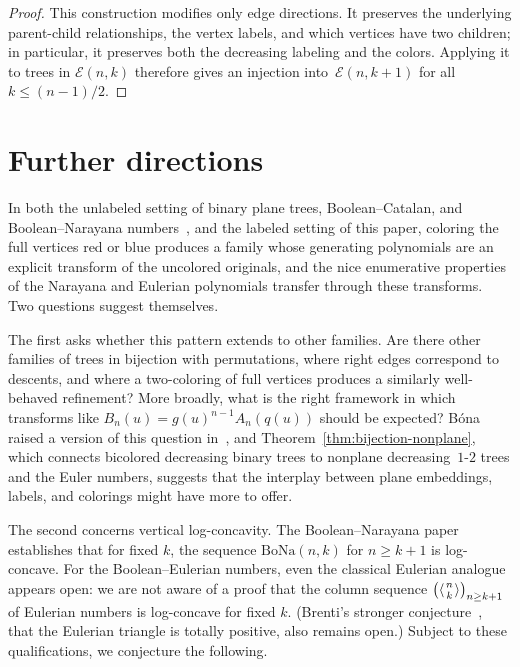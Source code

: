 \documentclass[10pt]{article}
\theoremstyle{plain}
\begin{document}
\begin{proof}
This construction modifies only edge directions. It preserves the underlying parent-child relationships, the vertex labels, and which vertices have two children; in particular, it preserves both the decreasing labeling and the colors. Applying it to trees in $\mathcal{E}(n,k)$ therefore gives an injection into~${\mathcal{E}(n,k+1)}$ for all $k \leq (n-1)/2$.
\end{proof}


\section{Further directions}
\label{sec:further}

In both the unlabeled setting of binary plane trees, Boolean--Catalan, and Boolean--Narayana numbers~\cite{bona:stack-sorting-p:, bona:boolean--naraya:}, and the labeled setting of this paper, coloring the full vertices red or blue produces a family whose generating polynomials are an explicit transform of the uncolored originals, and the nice enumerative properties of the Narayana and Eulerian polynomials transfer through these transforms. Two questions suggest themselves.

The first asks whether this pattern extends to other families. Are there other families of trees in bijection with permutations, where right edges correspond to descents, and where a two-coloring of full vertices produces a similarly well-behaved refinement? More broadly, what is the right framework in which transforms like $B_n(u) = g(u)^{n-1} A_n(q(u))$ should be expected? B\'ona raised a version of this question in~\cite{bona:boolean--naraya:}, and Theorem~\ref{thm:bijection-nonplane}, which connects bicolored decreasing binary trees to nonplane decreasing~$1$-$2$ trees and the Euler numbers, suggests that the interplay between plane embeddings, labels, and colorings might have more to offer.

The second concerns vertical log-concavity. The Boolean--Narayana paper~\cite{bona:boolean--naraya:} establishes that for fixed $k$, the sequence $\mathrm{BoNa}(n,k)$ for $n \geq k+1$ is log-concave. For the Boolean--Eulerian numbers, even the classical Eulerian analogue appears open: we are not aware of a proof that the column sequence $\bigl(\langle {n \atop k} \rangle\bigr)_{n \geq k+1}$ of Eulerian numbers is log-concave for fixed $k$. (Brenti's stronger conjecture~\cite{brenti:the-application:}, that the Eulerian triangle is totally positive, also remains open.) Subject to these qualifications, we conjecture the following.
\end{document}
